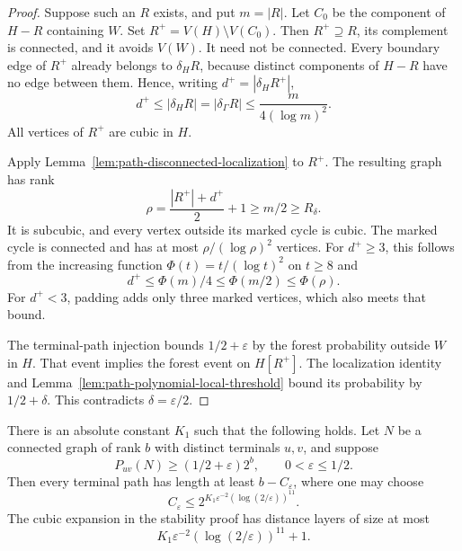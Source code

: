 \begin{proof}
Suppose such an $R$ exists, and put $m=|R|$.
Let $C_0$ be the component of $H-R$ containing $W$.
Set $R^+=V(H)\setminus V(C_0)$.
Then $R^+\supseteq R$, its complement is connected, and it avoids $V(W)$.
It need not be connected.
Every boundary edge of $R^+$ already belongs to $\delta_H R$, because distinct components of $H-R$ have no edge between them.
Hence, writing $d^+=|\delta_HR^+|$,
\[
 d^+\le|\delta_HR|=|\delta_\Gamma R|
 \le\frac{m}{4(\log m)^2}.
\]
All vertices of $R^+$ are cubic in $H$.

Apply Lemma~\ref{lem:path-disconnected-localization} to $R^+$.
The resulting graph has rank
\[
 \rho=\frac{|R^+|+d^+}{2}+1\ge m/2\ge R_\delta.
\]
It is subcubic, and every vertex outside its marked cycle is cubic.
The marked cycle is connected and has at most $\rho/(\log\rho)^2$ vertices.
For $d^+\ge3$, this follows from the increasing function $\Phi(t)=t/(\log t)^2$ on $t\ge8$ and
\[
 d^+\le\Phi(m)/4\le\Phi(m/2)\le\Phi(\rho).
\]
For $d^+<3$, padding adds only three marked vertices, which also meets that bound.

The terminal-path injection bounds $1/2+\varepsilon$ by the forest probability outside $W$ in $H$.
That event implies the forest event on $H[R^+]$.
The localization identity and Lemma~\ref{lem:path-polynomial-local-threshold} bound its probability by $1/2+\delta$.
This contradicts $\delta=\varepsilon/2$.
\end{proof}

\begin{theorem}
\label{thm:path-quantitative-additive}
There is an absolute constant $K_1$ such that the following holds.
Let $N$ be a connected graph of rank $b$ with distinct terminals $u,v$, and suppose
\[
 P_{uv}(N)\ge(1/2+\varepsilon)2^b,
 \qquad 0<\varepsilon\le1/2.
\]
Then every terminal path has length at least $b-C_\varepsilon$, where one may choose
\[
 C_\varepsilon\le
 2^{K_1\varepsilon^{-2}(\log(2/\varepsilon))^{11}}.
\]
The cubic expansion in the stability proof has distance layers of size at most
\[
 K_1\varepsilon^{-2}(\log(2/\varepsilon))^{11}+1.
\]
\end{theorem}

